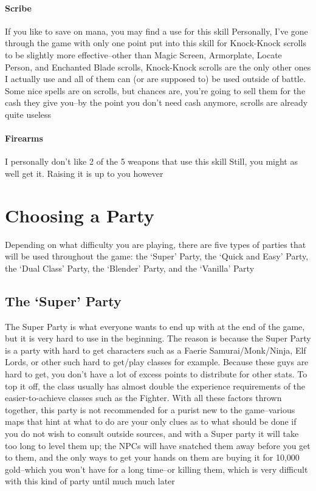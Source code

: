 \documentclass[12pt]{article}
\let\oldparagraph\paragraph
\renewcommand{\paragraph}[1]{\oldparagraph{#1}\mbox{}}
\begin{document}
\paragraph{Scribe} If you like to save on mana, you may find a use for this
skill Personally, I've gone through the game with only one point put into
this skill for Knock-Knock scrolls to be slightly more effective--other than
Magic Screen, Armorplate, Locate Person, and Enchanted Blade scrolls,
Knock-Knock scrolls are the only other ones I actually use and all of them
can (or are supposed to) be used outside of battle. Some nice spells are on
scrolls, but chances are, you're going to sell them for the cash they give
you--by the point you don't need cash anymore, scrolls are already quite
useless

\paragraph{Firearms} I personally don't like 2 of the 5 weapons that use this
skill Still, you might as well get it. Raising it is up to you however

\section{Choosing a Party}\label{choosing-a-party}

Depending on what difficulty you are playing, there are five types of
parties that will be used throughout the game: the `Super' Party, the
`Quick and Easy' Party, the `Dual Class' Party, the `Blender' Party, and
the `Vanilla' Party

\subsection{\texorpdfstring{The `Super'
Party}{The Super Party}}\label{the-super-party}

The Super Party is what everyone wants to end up with at the end of the
game, but it is very hard to use in the beginning. The reason is because
the Super Party is a party with hard to get characters such as a Faerie
Samurai/Monk/Ninja, Elf Lords, or other such hard to get/play classes
for example. Because these guys are hard to get, you don't have a lot of
excess points to distribute for other stats. To top it off, the class
usually has almost double the experience requirements of the
easier-to-achieve classes such as the Fighter. With all these factors
thrown together, this party is not recommended for a purist new to the
game--various maps that hint at what to do are your only clues as to
what should be done if you do not wish to consult outside sources, and
with a Super party it will take too long to level them up; the NPCs will
have snatched them away before you get to them, and the only ways to get
your hands on them are buying it for 10,000 gold--which you won't have
for a long time--or killing them, which is very difficult with this kind
of party until much much later
\end{document}
